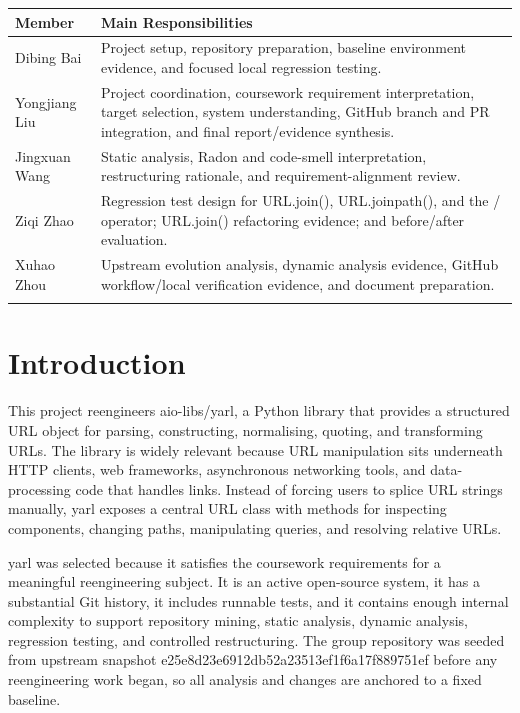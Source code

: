 \documentclass[11pt,a4paper]{article}
\begin{document}
\begin{longtable}{p{} p{}}
\toprule
Member & Main Responsibilities \\
\midrule
Dibing Bai & Project setup, repository preparation, baseline environment evidence, and focused local regression testing. \\
\addlinespace
Yongjiang Liu & Project coordination, coursework requirement interpretation, target selection, system understanding, GitHub branch and PR integration, and final report/evidence synthesis. \\
\addlinespace
Jingxuan Wang & Static analysis, Radon and code-smell interpretation, restructuring rationale, and requirement-alignment review. \\
\addlinespace
Ziqi Zhao & Regression test design for URL.join(), URL.joinpath(), and the / operator; URL.join() refactoring evidence; and before/after evaluation. \\
\addlinespace
Xuhao Zhou & Upstream evolution analysis, dynamic analysis evidence, GitHub workflow/local verification evidence, and document preparation. \\
\addlinespace
\bottomrule
\end{longtable}


\section*{Introduction}


This project reengineers aio-libs/yarl, a Python library that provides a structured URL object for parsing, constructing, normalising, quoting, and transforming URLs. The library is widely relevant because URL manipulation sits underneath HTTP clients, web frameworks, asynchronous networking tools, and data-processing code that handles links. Instead of forcing users to splice URL strings manually, yarl exposes a central URL class with methods for inspecting components, changing paths, manipulating queries, and resolving relative URLs.


yarl was selected because it satisfies the coursework requirements for a meaningful reengineering subject. It is an active open-source system, it has a substantial Git history, it includes runnable tests, and it contains enough internal complexity to support repository mining, static analysis, dynamic analysis, regression testing, and controlled restructuring. The group repository was seeded from upstream snapshot e25e8d23e6912db52a23513ef1f6a17f889751ef before any reengineering work began, so all analysis and changes are anchored to a fixed baseline.
\end{document}
